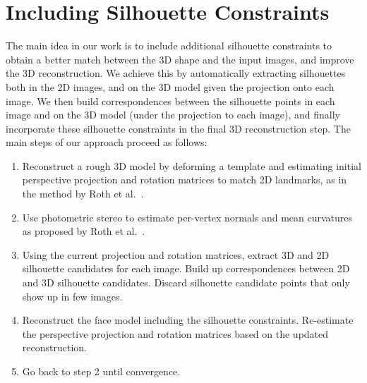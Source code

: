 \section{Including Silhouette Constraints}
\label{sec:silhouetteconstraints}

The main idea in our work is to include additional silhouette constraints to obtain a better match between the 3D shape and the input images, and improve the 3D reconstruction. We achieve this by automatically extracting silhouettes both in the 2D images, and on the 3D model given the projection onto each image. We then build correspondences between the silhouette points in each image and on the 3D model (under the projection to each image), and finally incorporate these silhouette constraints in the final 3D reconstruction step. 
%
%
The main steps of our approach proceed as follows:

\begin{enumerate}
\item Reconstruct a rough 3D model by deforming a template and estimating initial perspective projection and rotation matrices to match 2D landmarks, as in the method by Roth et al.~\cite{Roth:2015:UFR}. 

\item Use photometric stereo to estimate per-vertex normals and mean curvatures as proposed by Roth et al.~\cite{Roth:2015:UFR}.

\item Using the current projection and rotation matrices, extract 3D and 2D silhouette candidates for each image. Build up correspondences between 2D and 3D silhouette candidates. Discard silhouette candidate points that only show up in few images.

\item Reconstruct the face model including the silhouette constraints. Re-estimate the perspective projection and rotation matrices based on the updated reconstruction. 

\item Go back to step 2 until convergence. 
\end{enumerate}

